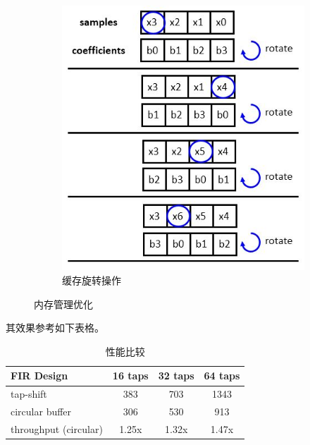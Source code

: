 \begin{figure}[ht!]
\begin{subfigure}{0.35\textwidth}
        \includegraphics[width=\textwidth]{figures/Rotation.jpg}
        \caption{缓存旋转操作}
        \label{fig:Rotation}
    \end{subfigure}
    \hfill
    \caption{内存管理优化}
    \label{fig:Buffer}
\end{figure}

其效果参考如下表格。
\begin{table}[ht!]
    \begin{center}
      \caption{性能比较}
      \label{tab:Buffer-Comparison}
      \begin{tabular}{l|c|c|c} %
        \textbf{FIR Design}     &\textbf{16 taps}   &\textbf{32 taps}   &\textbf{64 taps}\\
        \hline
        tap-shift               &383                &703                &1343\\
        circular buffer         &306                &530                &913\\
        throughput (circular)   &1.25x	            &1.32x              &1.47x\\
      \end{tabular}
    \end{center}
\end{table}

